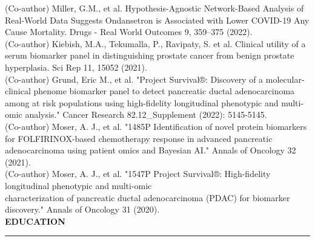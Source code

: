 \documentclass[a4paper]{article}
\newcommand{\myline}{\par
  \kern2pt %
  \hrule height 0.5pt
  \kern2pt %
}
\newcommand{\mybullet}{
	\indent 
  \textbullet \hspace*{2mm}
}
\begin{document}
  \mybullet (Co-author) Miller, G.M., et al. Hypothesis-Agnostic Network-Based Analysis of Real-World Data Suggests Ondansetron \hspace*{10mm}is Associated with Lower COVID-19 Any Cause Mortality. Drugs - Real World Outcomes 9, 359–375 (2022). \\
  \mybullet (Co-author) Kiebish, M.A., Tekumalla, P., Ravipaty, S. et al. Clinical utility of a serum biomarker panel in distinguishing \hspace*{10mm}prostate cancer from benign prostate hyperplasia. Sci Rep 11, 15052 (2021). \\
  \mybullet (Co-author) Grund, Eric M., et al. "Project Survival®: Discovery of a molecular-clinical phenome biomarker panel to \hspace*{10mm}detect pancreatic ductal adenocarcinoma among at risk populations using high-fidelity longitudinal phenotypic and \hspace*{10mm}multi-omic analysis." Cancer Research 82.12\_Supplement (2022): 5145-5145. \\
  \mybullet (Co-author) Moser, A. J., et al. "1485P Identification of novel protein biomarkers for FOLFIRINOX-based chemotherapy \hspace*{10mm}response in advanced pancreatic adenocarcinoma using patient omics and Bayesian AI." Annals of Oncology 32 (2021).\\ %
  \mybullet (Co-author) Moser, A. J., et al. "1547P Project Survival®: High-fidelity longitudinal phenotypic and multi-omic \\\hspace*{10mm}characterization of pancreatic ductal adenocarcinoma (PDAC) for biomarker discovery." Annals of Oncology 31 (2020).\\%
	

	\noindent
	{\large \textbf{EDUCATION}}
	\myline 
	\smallskip
	
\end{document}
